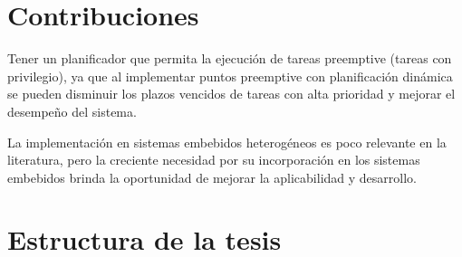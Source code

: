 
\section{Contribuciones}

Tener un planificador que permita la ejecución de tareas preemptive (tareas con privilegio), ya que al implementar puntos preemptive con planificación dinámica se pueden disminuir los plazos vencidos de tareas con alta prioridad y mejorar el desempeño del sistema.

La implementación en sistemas embebidos heterogéneos es poco relevante en la literatura, pero la creciente necesidad por su incorporación en los sistemas embebidos brinda la oportunidad de mejorar la aplicabilidad y desarrollo. 




\section {Estructura de la tesis}


